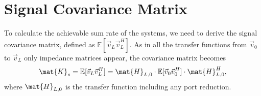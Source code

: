 \section{Signal Covariance Matrix}
\label{sec:sig_cov}
To calculate the achievable sum rate of the systems, we need to derive the signal covariance matrix, defined as $\mathbb{E}[\vec{v}_L\vec{v}_L^H]$.
As in all the transfer functions from $\vec{v}_0$ to $\vec{v}_L$ only impedance matrices appear, the covariance matrix becomes
\begin{equation}
\mat{K}_s=\mathbb{E}[\vec{v}_L\vec{v}_L^H] = \mat{H}_{L,0}\cdot\mathbb{E}[\vec{v}_0\vec{v}_0^H]\cdot\mat{H}_{L,0}^H,
\end{equation}
where $\mat{H}_{L,0}$ is the transfer function including any port reduction.


